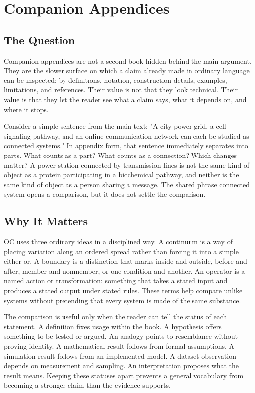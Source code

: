 \documentclass[11pt,a4paper,openany]{book}
\begin{document}
\section{Companion Appendices}
\subsection{The Question}
Companion appendices are not a second book hidden behind the main argument. They are the slower surface on which a claim already made in ordinary language can be inspected: by definitions, notation, construction details, examples, limitations, and references. Their value is not that they look technical. Their value is that they let the reader see what a claim says, what it depends on, and where it stops. \cite{raf_networks,bak_soc}\par
Consider a simple sentence from the main text: "A city power grid, a cell-signaling pathway, and an online communication network can each be studied as connected systems." In appendix form, that sentence immediately separates into parts. What counts as a part? What counts as a connection? Which changes matter? A power station connected by transmission lines is not the same kind of object as a protein participating in a biochemical pathway, and neither is the same kind of object as a person sharing a message. The shared phrase connected system opens a comparison, but it does not settle the comparison.\par
\subsection{Why It Matters}
OC uses three ordinary ideas in a disciplined way. A continuum is a way of placing variation along an ordered spread rather than forcing it into a simple either-or. A boundary is a distinction that marks inside and outside, before and after, member and nonmember, or one condition and another. An operator is a named action or transformation: something that takes a stated input and produces a stated output under stated rules. These terms help compare unlike systems without pretending that every system is made of the same substance. \cite{raf_networks,bak_soc}\par
The comparison is useful only when the reader can tell the status of each statement. A definition fixes usage within the book. A hypothesis offers something to be tested or argued. An analogy points to resemblance without proving identity. A mathematical result follows from formal assumptions. A simulation result follows from an implemented model. A dataset observation depends on measurement and sampling. An interpretation proposes what the result means. Keeping these statuses apart prevents a general vocabulary from becoming a stronger claim than the evidence supports.\par
\end{document}
